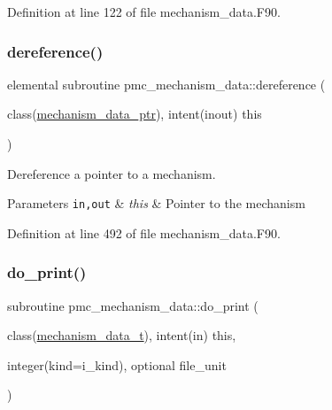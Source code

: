 Definition at line 122 of file mechanism\+\_\+data.\+F90.

\mbox{\label{namespacepmc__mechanism__data_acb9f7c490ea7619fdf383db20023202d}} 
\subsubsection{\texorpdfstring{dereference()}{dereference()}}
{\footnotesize\ttfamily elemental subroutine pmc\+\_\+mechanism\+\_\+data\+::dereference (\begin{DoxyParamCaption}\item[{class(\mbox{\hyperlink{structpmc__mechanism__data_1_1mechanism__data__ptr}{mechanism\+\_\+data\+\_\+ptr}}), intent(inout)}]{this }\end{DoxyParamCaption})\hspace{0.3cm}{\ttfamily [private]}}



Dereference a pointer to a mechanism. 


\begin{DoxyParams}[1]{Parameters}
\mbox{\tt in,out}  & {\em this} & Pointer to the mechanism \\
\hline
\end{DoxyParams}


Definition at line 492 of file mechanism\+\_\+data.\+F90.

\mbox{\label{namespacepmc__mechanism__data_a6a010f3dccb9fb0ac7682f5a1bef3d12}} 
\subsubsection{\texorpdfstring{do\+\_\+print()}{do\_print()}}
{\footnotesize\ttfamily subroutine pmc\+\_\+mechanism\+\_\+data\+::do\+\_\+print (\begin{DoxyParamCaption}\item[{class(\mbox{\hyperlink{structpmc__mechanism__data_1_1mechanism__data__t}{mechanism\+\_\+data\+\_\+t}}), intent(in)}]{this,  }\item[{integer(kind=i\+\_\+kind), optional}]{file\+\_\+unit }\end{DoxyParamCaption})\hspace{0.3cm}{\ttfamily [private]}}




